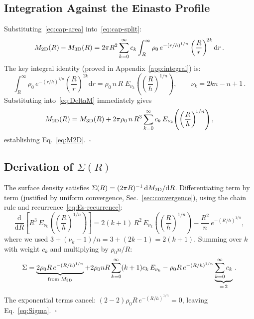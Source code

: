 \documentclass{article}
\begin{document}
\subsection{Integration Against the Einasto Profile}

Substituting~\eqref{eq:cap-area} into~\eqref{eq:cap-split}:
\begin{equation}\label{eq:DeltaM}
M_{\rm 2D}(R) - M_{\rm 3D}(R)
= 2\pi R^2 \sum_{k=0}^{\infty} c_k
\int_R^{\infty}\rho_0\,e^{-(r/h)^{1/n}}\left(\frac{R}{r}\right)^{\!2k}\mathrm{d}r\,.
\end{equation}
The key integral identity (proved in Appendix~\ref{app:integral}) is:
\begin{equation}\label{eq:Jk}
\boxed{\;
\int_R^{\infty}\rho_0\,e^{-(r/h)^{1/n}}\left(\frac{R}{r}\right)^{\!2k}\mathrm{d}r
= \rho_0\,n\,R\;E_{\nu_k}\!\left(\left(\frac{R}{h}\right)^{\!1/n}\right),
\qquad \nu_k = 2kn-n+1\,.\;}
\end{equation}
Substituting into~\eqref{eq:DeltaM} immediately gives
\begin{equation}
M_{\rm 2D}(R) = M_{\rm 3D}(R) + 2\pi\rho_0\,n\,R^3
\sum_{k=0}^{\infty}c_k\,E_{\nu_k}\!\left(\left(\frac{R}{h}\right)^{\!1/n}\right),
\end{equation}
establishing Eq.~\eqref{eq:M2D}.~$\square$

\subsection{Derivation of $\Sigma(R)$}

The surface density satisfies
$\Sigma(R) = (2\pi R)^{-1}\,\mathrm{d}M_{\rm 2D}/\mathrm{d}R$.
Differentiating term by term (justified by uniform convergence,
Sec.~\ref{sec:convergence}), using the chain rule and
recurrence~\eqref{eq:Es-recurrence}:
\begin{equation}
\frac{\mathrm{d}}{\mathrm{d}R}\left[R^3\,E_{\nu_k}\!\left(\left(\frac{R}{h}\right)^{\!1/n}\right)\right]
= 2(k+1)\,R^2\,E_{\nu_k}\!\left(\left(\frac{R}{h}\right)^{\!1/n}\right)
- \frac{R^2}{n}\,e^{-(R/h)^{1/n}},
\end{equation}
where we used $3+(\nu_k-1)/n = 3+(2k-1) = 2(k+1)$.  Summing over $k$ with
weight $c_k$ and multiplying by $\rho_0 n/R$:
\begin{equation}
\Sigma = \underbrace{2\rho_0 R\,e^{-(R/h)^{1/n}}}_{\text{from } M_{\rm 3D}}
+ 2\rho_0 nR\sum_{k=0}^{\infty}(k+1)c_k\,E_{\nu_k}
- \rho_0 R\,e^{-(R/h)^{1/n}}\underbrace{\sum_{k=0}^{\infty}c_k}_{=\,2}\,.
\end{equation}
The exponential terms cancel: $(2-2)\rho_0 R\,e^{-(R/h)^{1/n}}=0$, leaving
Eq.~\eqref{eq:Sigma}.~$\square$
\end{document}

